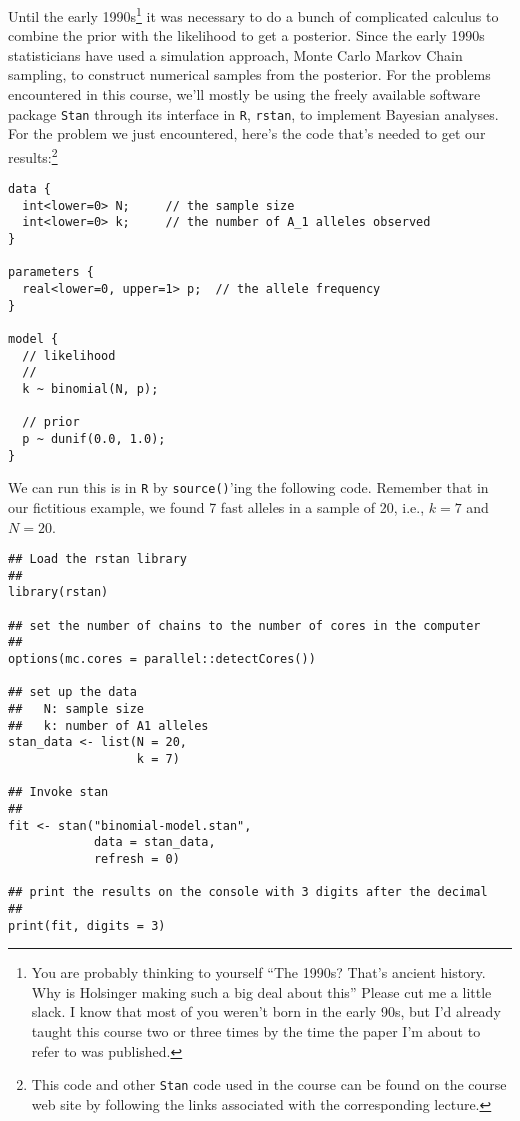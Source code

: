 Until the early 1990s\footnote{You are probably thinking to yourself
  ``The 1990s? That's ancient history. Why is Holsinger making such a
  big deal about this'' Please cut me a little slack. I know that most
  of you weren't born in the early 90s, but I'd already taught this
  course two or three times by the time the paper I'm about to refer
  to was published.} it was necessary to do a bunch of complicated
calculus to combine the prior with the likelihood to get a
posterior. Since the early 1990s statisticians have used a simulation
approach, Monte Carlo Markov Chain sampling, to construct numerical
samples from the posterior. For the problems encountered in this
course, we'll mostly be using the freely available software package
{\tt Stan} through its interface in {\tt R}, {\tt rstan}, to implement
Bayesian analyses. For the problem we just encountered, here's the
code that's needed to get our results:\footnote{This code and other
  {\tt Stan} code used in the course can be found on the course web
  site by following the links associated with the corresponding
  lecture.}
\begin{verbatim}
data {
  int<lower=0> N;     // the sample size
  int<lower=0> k;     // the number of A_1 alleles observed
}

parameters {
  real<lower=0, upper=1> p;  // the allele frequency
}

model {
  // likelihood
  //
  k ~ binomial(N, p);

  // prior
  p ~ dunif(0.0, 1.0);
}
\end{verbatim}
We can run this is in {\tt R} by {\tt source()}'ing the following
code. Remember that in our fictitious example, we found 7 fast alleles
in a sample of 20, i.e., $k=7$ and $N=20$.
\begin{verbatim}
## Load the rstan library
##
library(rstan)

## set the number of chains to the number of cores in the computer
##
options(mc.cores = parallel::detectCores())

## set up the data
##   N: sample size
##   k: number of A1 alleles
stan_data <- list(N = 20,
                  k = 7)

## Invoke stan
##
fit <- stan("binomial-model.stan",
            data = stan_data,
            refresh = 0)

## print the results on the console with 3 digits after the decimal
##
print(fit, digits = 3)
\end{verbatim}

